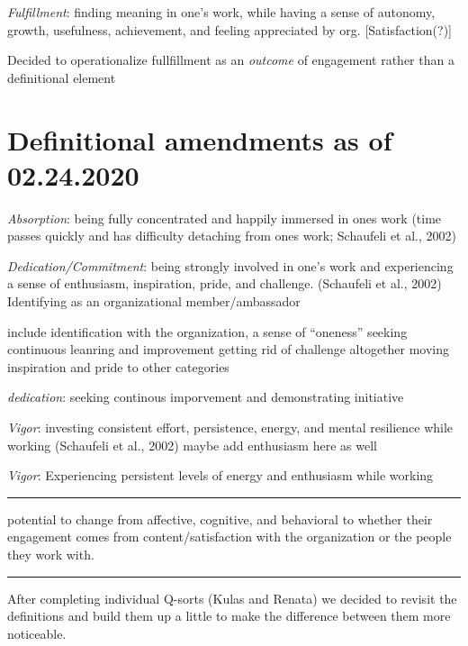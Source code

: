 \documentclass[
]{book}
\begin{document}
\emph{Fulfillment}: finding meaning in one's work, while having a sense of autonomy, growth, usefulness, achievement, and feeling appreciated by org. {[}Satisfaction(?){]}

Decided to operationalize fullfillment as an \emph{outcome} of engagement rather than a definitional element

\hypertarget{definitional-amendments-as-of-02.24.2020}{%
\section{Definitional amendments as of 02.24.2020}\label{definitional-amendments-as-of-02.24.2020}}

\emph{Absorption}: being fully concentrated and happily immersed in ones work (time passes quickly and has difficulty detaching from ones work; Schaufeli et al., 2002)

\emph{Dedication/Commitment}: being strongly involved in one's work and experiencing a sense of enthusiasm, inspiration, pride, and challenge. (Schaufeli et al., 2002) Identifying as an organizational member/ambassador

include identification with the organization, a sense of ``oneness''
seeking continuous leanring and improvement
getting rid of challenge altogether
moving inspiration and pride to other categories

\emph{dedication}: seeking continous imporvement and demonstrating initiative

\emph{Vigor}: investing consistent effort, persistence, energy, and mental resilience while working (Schaufeli et al., 2002)
maybe add enthusiasm here as well

\emph{Vigor}: Experiencing persistent levels of energy and enthusiasm while working

\begin{center}\rule{0.5\linewidth}{0.5pt}\end{center}

potential to change from affective, cognitive, and behavioral to whether their engagement comes from content/satisfaction with the organization or the people they work with.

\begin{center}\rule{0.5\linewidth}{0.5pt}\end{center}

After completing individual Q-sorts (Kulas and Renata) we decided to revisit the definitions and build them up a little to make the difference between them more noticeable.
\end{document}
